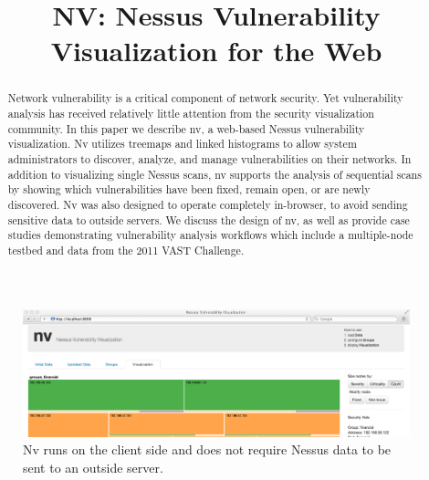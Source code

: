 \documentclass{acm_proc_article-sp}
\begin{document}
\title{NV: Nessus Vulnerability Visualization for the Web}


\author{
}

\maketitle
\begin{abstract}

Network vulnerability is a critical component of network security. 
Yet vulnerability analysis has received relatively little attention from the security visualization community.  
In this paper we describe nv, a web-based Nessus vulnerability visualization. 
Nv utilizes treemaps and linked histograms to allow system administrators to discover, analyze, and manage vulnerabilities on their networks. 
In addition to visualizing single Nessus scans, nv supports the analysis of sequential scans by showing which vulnerabilities have been fixed, remain open, or are newly discovered.
Nv was also designed to operate completely in-browser, to avoid sending sensitive data to outside servers.
We discuss the design of nv, as well as provide case studies demonstrating vulnerability analysis workflows which include a multiple-node testbed and data from the 2011 VAST Challenge.

\end{abstract}




\begin{figure}
  \centering
  \includegraphics[width=1.0\textwidth]{../screenshots/overview_new_cropped}
  \caption{Nv runs on the client side and does not require Nessus data to be sent to an outside server.}
\end{figure}
\end{document}
